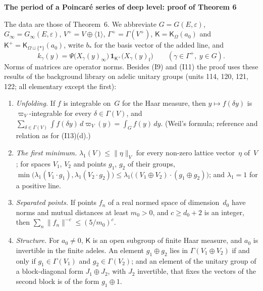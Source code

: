 \documentclass[11pt,a4paper]{article}
\newcommand{\m}[1]{\mbox{$#1$}}        %
\newcommand{\sect}[2]{\refstepcounter{section}\label{#2}\par\addvspace{19pt plus 4pt minus 2pt}\Needspace{7\baselineskip}%
  \noindent\llap{{\fontsize{13.2}{16}\selectfont\bfseries\color{inkfaint}\thesection}\hspace{9pt}}%
  {\fontsize{13.2}{16}\selectfont\bfseries\color{ink}#1}\par\nopagebreak\vspace{-1pt}}
\theoremstyle{plainx}
\theoremstyle{uprightx}
\newcommand{\nrm}[1]{\lVert #1\rVert}
\newcommand{\inp}[1]{\textup{(I#1)}}
\begin{document}
\sect{The period of a Poincaré series of deep level: proof of Theorem 6}{s:period}
The data are those of Theorem~6. We abbreviate \m{G=G(E,\varepsilon)}, $G_\infty=G_\infty(E,\varepsilon)$,
\m{V^{+}=V\oplus\langle1\rangle}, \m{\Gamma^{+}=\Gamma(V^{+})}, \m{\mathsf{K}=\mathsf{K}_\Omega(a_0)} and $\mathsf{K}^{+}=\mathsf{K}_{\Omega\sqcup\{*\}}(a_0)$,
write $b_{*}$ for the basis vector of the added line, and
\[k_\gamma(y)=\Psi\bigl(X_\gamma(y)_\infty\bigr)\,\mathbf{1}_{\mathsf{K}^{+}}\bigl(X_\gamma(y)_{\mathrm f}\bigr)\qquad(\gamma\in\Gamma^{+},\ y\in G).\]
Norms of matrices are operator norms. Besides \inp{9} and \inp{11} the proof uses these results of the background
library on adelic unitary groups (units 114, 120, 121, 122; all elementary except the first):
\begin{enumerate}[label=\textup{(A\arabic*)},leftmargin=2.9em,itemsep=1pt]
\item \emph{Unfolding.} If $f$ is integrable on~$G$ for the Haar measure, then \m{y\mapsto f(\delta y)} is
  $\varpi_V$-integrable for every \m{\delta\in\Gamma(V)}, and
  $\sum_{\delta\in\Gamma(V)}\int f(\delta y)\,d\varpi_V(y)=\int_Gf(y)\,dy$. (Weil's formula; reference and relation as
  for \inp{13}(d).)
\item \emph{The first minimum.} \m{\lambda_1(V)\le\nrm{\eta}_V} for every non-zero lattice vector~$\eta$ of~$V$; for
  spaces $V_1$, $V_2$ and points $g_1$, $g_2$ of their groups,
  $\min\bigl(\lambda_1(V_1\cdot g_1),\lambda_1(V_2\cdot g_2)\bigr)\le\lambda_1\bigl((V_1\oplus V_2)\cdot(g_1\oplus g_2)\bigr)$; and
  \m{\lambda_1=1} for a positive line.
\item \emph{Separated points.} If points $f_n$ of a real normed space of dimension~$d_0$ have norms and mutual
  distances at least \m{m_0>0}, and \m{c\ge d_0+2} is an integer, then $\sum_n\nrm{f_n}^{-c}\le(5/m_0)^{c}$.
\item \emph{Structure.} For \m{a_0\ne0}, $\mathsf{K}$ is an open subgroup of finite Haar measure, and $a_0$ is invertible in
  the finite adeles. An element \m{g_1\oplus g_2} lies in \m{\Gamma(V_1\oplus V_2)} if and only if \m{g_1\in\Gamma(V_1)} and
  \m{g_2\in\Gamma(V_2)}; and an element of the unitary group of a block-diagonal form \m{J_1\oplus J_2}, with $J_2$
  invertible, that fixes the vectors of the second block is of the form \m{g_1\oplus1}.
\end{enumerate}
\end{document}
